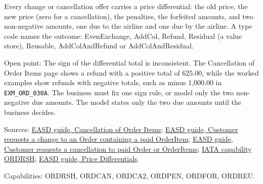 
\begin{definition}
  \label{def:change-cancellation-price-differential}
  Every change or cancellation offer carries a price differential: the old
  price, the new price (zero for a cancellation), the penalties, the
  forfeited amounts, and two non-negative amounts, one due to the airline
  and one due by the airline. A type code names the outcome: EvenExchange,
  AddCol, Refund, Residual (a value store), Reusable, AddColAndRefund or
  AddColAndResidual.

  Open point: The sign of the differential total is inconsistent. The
  Cancellation of Order Items page shows a refund with a positive total of
  625.00, while the worked examples show refunds with negative totals, such
  as minus 1,000.00 in \texttt{EXM\_ORD\_030A}. The business must fix one
  sign rule, or model only the two non-negative due amounts. The model states
  only the two due amounts until the business decides.

  Sources: \href{https://standards.atlassian.net/wiki/spaces/EASD/pages/574783569}{EASD guide, Cancellation of Order Items};
  \href{https://standards.atlassian.net/wiki/spaces/EASD/pages/842268673}{EASD guide, Customer requests a change to an Order containing a paid OrderItem};
  \href{https://standards.atlassian.net/wiki/spaces/EASD/pages/817594369}{EASD guide, Customer requests a cancellation to paid Order or OrderItems};
  \href{https://retailing.iata.org/armi/docs/ORDRSH/}{IATA capability ORDRSH};
  \href{https://standards.atlassian.net/wiki/spaces/EASD/pages/574554213/Price+Differentials}{EASD guide, Price Differentials}.

  Capabilities: ORDRSH, ORDCAN, ORDCA2, ORDPEN, ORDFOR, ORDREU.
\end{definition}

